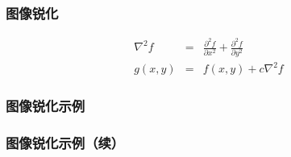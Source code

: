 \documentclass{beamer}
\begin{document}
{{\begin{frame}
\end{frame}}{\frametitle{图像锐化}
\begin{eqnarray*}
  \nabla^2 f & = & \frac{\partial^2 f}{\partial x^2} + \frac{\partial^2
  f}{\partial y^2}\\
  g (x, y) & = & f (x, y) + c \nabla^2 f
\end{eqnarray*}}{\begin{frame}
  \frametitle{图像锐化示例}
  
  {\hspace{4em}}
\end{frame}}{\begin{frame}
  \frametitle{图像锐化示例（续）}
  

\end{frame}}}
\end{document}
